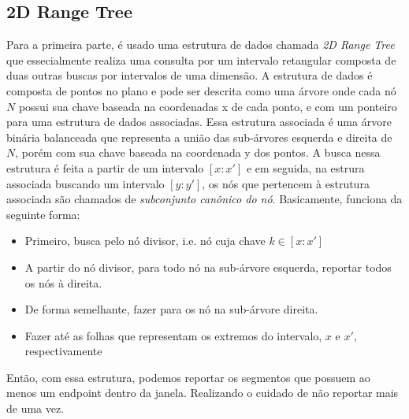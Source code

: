 \documentclass{article}
\theoremstyle{definition}
\begin{document}
\subsection{2D Range Tree}
\hspace*{15pt} Para a primeira parte, é usado uma estrutura de dados chamada
\textit{2D Range Tree} que essecialmente realiza uma consulta por um intervalo 
retangular composta de duas outras buscas por intervalos de uma dimensão. A 
estrutura de dados é composta de pontos no plano e pode ser descrita como uma 
árvore onde cada nó $N$ possui sua chave baseada na coordenadas x de cada ponto, e com
um ponteiro para uma estrutura de dados associadas. Essa estrutura associada é 
uma árvore binária balanceada que representa a união das sub-árvores esquerda e 
direita de $N$, porém com sua chave baseada na coordenada y dos pontos. A busca 
nessa estrutura é feita a partir de um intervalo $[x:x']$ e em seguida, na estrura
associada buscando um intervalo $[y:y']$, os nós que pertencem à estrutura associada
são chamados de \textit{subconjunto canônico do nó}. Basicamente, funciona da 
seguinte forma:
 \begin{itemize}
    \item Primeiro, busca pelo nó divisor, i.e. nó cuja chave $k \in [x:x']$ 
    \item A partir do nó divisor, para todo nó na sub-árvore esquerda, reportar
        todos os nós à direita.
    \item De forma semelhante, fazer para os nó na sub-árvore direita.
    \item Fazer até as folhas que representam os extremos do intervalo,
         $x$ e $x'$, respectivamente
 \end{itemize}

\hspace*{15pt} Então, com essa estrutura, podemos reportar os segmentos que possuem
ao menos um endpoint dentro da janela. Realizando o cuidado de não reportar mais 
de uma vez.
\end{document}
